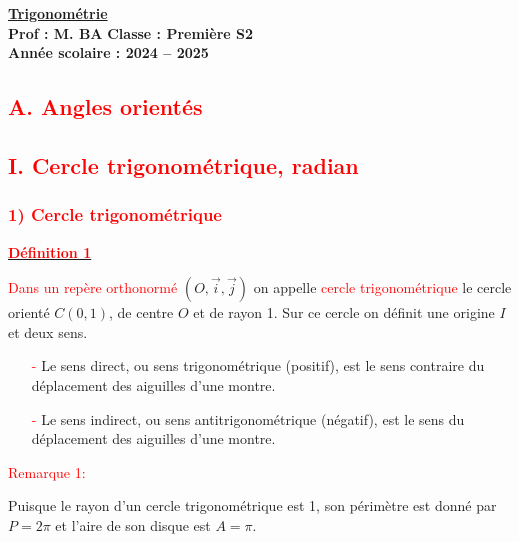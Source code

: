 \documentclass[a4paper,12pt]{article}
\begin{document}
\small
\begin{center}
    \Large\textbf{\underline{Trigonométrie}}\\[0.2cm]
    \large\textbf{Prof : M. BA} \hfill \textbf{Classe : Première S2}\\[0.1cm]
    \normalsize\textbf{Année scolaire : 2024 -- 2025}
\end{center}

\subsection*{\textcolor{red}{A. Angles orientés}}

\subsection*{\textcolor{red}{I. Cercle trigonométrique, radian}}

\subsubsection*{\textcolor{red}{1) Cercle trigonométrique}}

\underline{\textbf{\textcolor{red}{Définition 1}}}

\textcolor{red}{Dans un repère orthonormé} \( (O, \vec{i}, \vec{j}) \) on appelle \textcolor{red}{cercle trigonométrique} le cercle orienté \( C(0,1) \), de centre \( O \) et de rayon 1. Sur ce cercle on définit une origine \( I \) et deux sens.


\begin{itemize}
    \item[\textcolor{red}{-}] Le sens direct, ou sens trigonométrique (positif), est le sens contraire du déplacement des aiguilles d'une montre.
    \item[\textcolor{red}{-}] Le sens indirect, ou sens antitrigonométrique (négatif), est le sens du déplacement des aiguilles d'une montre.
\end{itemize}

\textcolor{red}{Remarque 1:}

Puisque le rayon d'un cercle trigonométrique est 1, son périmètre est donné par \( P = 2\pi \) et l'aire de son disque est \( A = \pi \).
\end{document}
